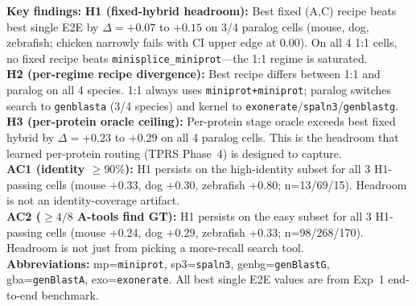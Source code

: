 \begin{table}[t]
\vspace{4pt}
\footnotesize
\textbf{Key findings:}
\textbf{H1 (fixed-hybrid headroom):} Best fixed (A,C) recipe beats best single E2E by $\Delta = +0.07$ to $+0.15$ on 3/4 paralog cells (mouse, dog, zebrafish; chicken narrowly fails with CI upper edge at 0.00). On all 4 1:1 cells, no fixed recipe beats \texttt{minisplice\_miniprot}---the 1:1 regime is saturated.\\
\textbf{H2 (per-regime recipe divergence):} Best recipe differs between 1:1 and paralog on all 4 species. 1:1 always uses \texttt{miniprot+miniprot}; paralog switches search to \texttt{genblasta} (3/4 species) and kernel to \texttt{exonerate}/\texttt{spaln3}/\texttt{genblastg}.\\
\textbf{H3 (per-protein oracle ceiling):} Per-protein stage oracle exceeds best fixed hybrid by $\Delta = +0.23$ to $+0.29$ on all 4 paralog cells. This is the headroom that learned per-protein routing (TPRS Phase~4) is designed to capture.\\
\textbf{AC1 (identity $\ge 90\%$):} H1 persists on the high-identity subset for all 3 H1-passing cells (mouse +0.33, dog +0.30, zebrafish +0.80; n=13/69/15). Headroom is not an identity-coverage artifact.\\
\textbf{AC2 ($\ge 4/8$ A-tools find GT):} H1 persists on the easy subset for all 3 H1-passing cells (mouse +0.24, dog +0.29, zebrafish +0.33; n=98/268/170). Headroom is not just from picking a more-recall search tool.\\
\textbf{Abbreviations:} mp=\texttt{miniprot}, sp3=\texttt{spaln3}, genbg=\texttt{genBlastG}, gba=\texttt{genBlastA}, exo=\texttt{exonerate}. All best single E2E values are from Exp~1 end-to-end benchmark.
\end{table}

